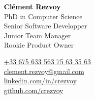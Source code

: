 \documentclass[a4paper]{article}
\newcommand\enfr[2]{\ifdefined\doen#1\else#2\fi\xspace}
\begin{document}
\color{DarkSlateGray}


\begin{minipage}[t]{0.63\textwidth}
  \Huge\textcolor{Black}{\textbf{Clément Rezvoy}}\normalsize\\

  PhD in Computer Science\\
  Senior Software Developper\\
  Junior Team Manager\\
  Rookie Product Owner\\
\end{minipage}
\hfill
\begin{minipage}[t]{0.27\textwidth}
  \hyperlink{tel:+33-675-633-563}{\enfr{+33 675 633 563}{06 75 63 35 63}} \\
  \hyperlink{mailto:clement.rezvoy@gmail.com}{clement.rezvoy@gmail.com} \\
  \hyperlink{https://linkedin.com/in/crezvoy}{linkedin.com/in/crezvoy} \\
  \hyperlink{https://github.com/crezvoy}{github.com/crezvoy}
\end{minipage}
\end{document}
